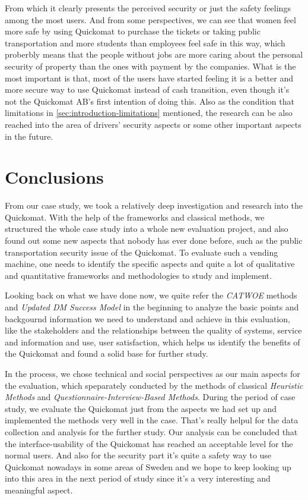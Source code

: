 \documentclass[twocolumn]{article}
\begin{document}
From which it clearly presents the perceived security or just the safety feelings among the most users. And from some perspectives, we can see that women feel more safe by using Quickomat to purchase the tickets or taking public transportation and more students than employees feel safe in this way, which proberbly means that the people without jobs are more caring about the personal security of property than the ones with payment by the companies. What is the most important is that, most of the users have started feeling it is a better and more secure way to use Quickomat instead of cash transition, even though it's not the Quickomat AB's first intention of doing this. %
Also as the condition that limitations in \ref{sec:introduction-limitations} mentioned, the research can be also reached into the area of drivers' security aspects or some other important aspects in the future.


\section{Conclusions}
From our case study, we took a relatively deep investigation and research into the Quickomat. With the help of the frameworks and classical methods, we structured the whole case study into a whole new evaluation project, and also found out some new aspects that nobody has ever done before, such as the public transportation security issue of the Quickomat. To evaluate such a vending machine, one needs to identify the specific aspects and quite a lot of qualitative and quantitative frameworks and methodologies to study and implement. 

Looking back on what we have done now, we quite refer the \emph{CATWOE} methods and \emph{Updated DM Success Model} in the beginning to analyze the basic points and backgournd information we need to understand and achieve in this evaluation, like the stakeholders and the relationships between the quality of systems, service and information and use, user satisfaction, which helps us identify the benefits of the Quickomat and found a solid base for further study. 

In the process, we chose technical and social perspectives as our main aspects for the evaluation, which speparately conducted by the methods of classical \emph{Heuristic Methods} and \emph{Questionnaire-Interview-Based Methods}. During the period of case study, we evaluate the Quickomat just from the aspects we had set up and implemented the methods very well in the case. That's really helpul for the data collection and analysis for the further study. Our analysis can be concluded that the interface-usability of the Quickomat has reached an acceptable level for the normal users. And also for the security part it's quite a safety way to use Quickomat nowadays in some areas of Sweden and we hope to keep looking up into this area in the next period of study since it's a very interesting and meaningful aspect.
\end{document}
